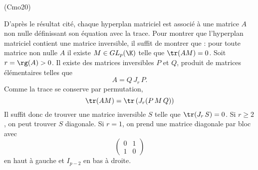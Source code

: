 \begin{tiny}(Cmo20)\end{tiny} D'après le résultat cité, chaque hyperplan matriciel est associé à une matrice $A$ non nulle définissant son équation avec la trace. Pour montrer que l'hyperplan matriciel contient une matrice inversible, il suffit de montrer que : pour toute matrice non nulle $A$ il existe $M \in GL_p(\K)$ telle que $\tr(AM) = 0$.\newline
Soit $r = \rg(A)>0$. Il existe des matrices inversibles $P$ et $Q$, produit de matrices élémentaires telles que
\[
 A = Q\,J_r\,P.
\]
Comme la trace se conserve par permutation,
\[
 \tr(AM) = \tr\left( J_r(P\, M\, Q)\right) 
\]
Il suffit donc de trouver une matrice inversible $S$ telle que $\tr(J_r\,S) = 0$.\newline
Si $r\geq 2$, on peut trouver $S$ diagonale. Si $r = 1$, on prend une matrice diagonale par bloc avec
\[
 \begin{pmatrix}
  0 & 1 \\ 1 & 0
 \end{pmatrix}
\]
en haut à gauche et $I_{p-2}$ en bas à droite.
